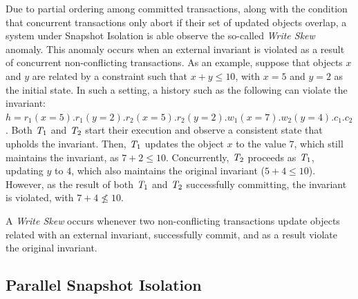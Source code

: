 Due to partial ordering among committed transactions, along with the condition that concurrent transactions only abort if their set of updated objects overlap, a system under Snapshot Isolation is able observe the so-called \emph{Write Skew} anomaly. This anomaly occurs when an external invariant is violated as a result of concurrent non-conflicting transactions. As an example, suppose that objects $x$ and $y$ are related by a constraint such that $x + y \le 10$, with $x = 5$ and $y = 2$ as the initial state. In such a setting, a history such as the following can violate the invariant: $h = r_1(x=5).r_1(y=2).r_2(x=5).r_2(y=2).w_1(x=7).w_2(y=4).c_1.c_2$. Both $\mathit{T}_1$ and $\mathit{T}_2$ start their execution and observe a consistent state that upholds the invariant. Then, $\mathit{T}_1$ updates the object $x$ to the value $7$, which still maintains the invariant, as $7 + 2 \le 10$. Concurrently, $\mathit{T}_2$ proceeds as $\mathit{T}_1$, updating $y$ to $4$, which also maintains the original invariant ($5 + 4 \le 10$). However, as the result of both $\mathit{T}_1$ and $\mathit{T}_2$ successfully committing, the invariant is violated, with $7 + 4 \not\le 10$.




\begin{definition}
A \emph{Write Skew} occurs whenever two non-conflicting transactions update objects related with an external invariant, successfully commit, and as a result violate the original invariant.
\end{definition}

\subsection{Parallel Snapshot Isolation}
